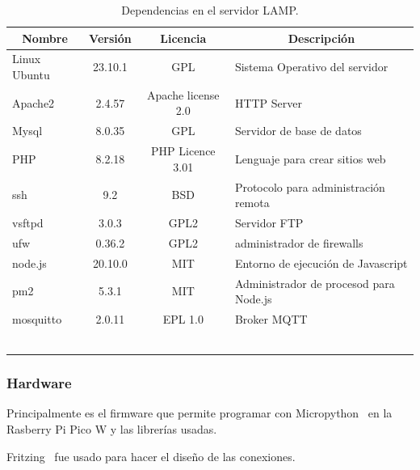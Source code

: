 \footnotesize%
\begin{longtable}[c]{@{}lccl@{}}
\toprule
\multicolumn{1}{c}{\textbf{Nombre}} & \textbf{Versión} & \textbf{Licencia} & \multicolumn{1}{c}{\textbf{Descripción}} \\ \midrule
\endfirsthead
%
\endhead
%
\bottomrule
\endfoot
%
\endlastfoot
%
Linux Ubuntu & 23.10.1  & GPL & Sistema Operativo del servidor \\
Apache2 & 2.4.57 & Apache license 2.0 &  HTTP Server\\
Mysql & 8.0.35 & GPL &  Servidor de base de datos\\
PHP & 8.2.18 & PHP Licence 3.01 &  Lenguaje para crear sitios web\\
ssh & 9.2 & BSD & Protocolo para administración remota\\
vsftpd & 3.0.3 & GPL2 & Servidor FTP\\
ufw & 0.36.2 &  GPL2 & administrador de firewalls\\
node.js & 20.10.0  & MIT &  Entorno de ejecución de Javascript\\
pm2 & 5.3.1 & MIT & Administrador de procesod para Node.js\\
mosquitto & 2.0.11 & EPL 1.0 & Broker MQTT \\
\bottomrule~\\
\caption{Dependencias en el servidor LAMP.}
\label{tabla:serviciosLAMP}
\end{longtable}
\normalsize

\subsubsection{Hardware}

Principalmente es el firmware que permite programar con Micropython~\cite{wiki:micropython} en la Rasberry Pi Pico W y las librerías usadas.

Fritzing~\cite{misc:Fritzing} fue usado para hacer el diseño de las conexiones.

